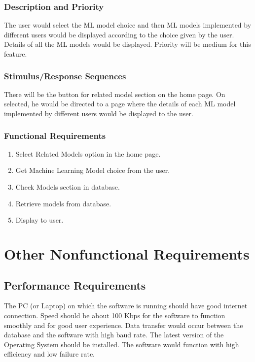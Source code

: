 \documentclass{scrreprt}
\begin{document}
\subsection{Description and Priority}
The user would select the ML model choice and then ML models implemented by different users would be displayed according to the choice given by the user. Details of all the ML models would be displayed. Priority will be medium for this feature.

\subsection{Stimulus/Response Sequences}
 There will be the button for related model section on the home page. On selected, he would be directed to a page where the details of each ML model implemented by different users would be displayed to the user.

\subsection{Functional Requirements}
\begin{enumerate}
\item Select Related Models option in the home page.
\item Get Machine Learning Model choice from the user.
\item Check Models section in database.
\item Retrieve models from database.
\item Display to user.
\end{enumerate}




\chapter{Other Nonfunctional Requirements}

\section{Performance Requirements}
The PC (or Laptop) on which the software is running should have good internet connection. Speed should be about 100 Kbps for the software to function smoothly and for good user experience. Data transfer would occur between the database and the software with high baud rate. The latest version of the Operating System should be installed. The software would function with high efficiency and low failure rate.
\end{document}
